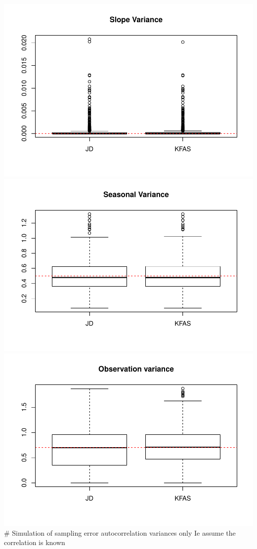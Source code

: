 \documentclass[]{article}
\begin{document}
\includegraphics{simulation_test_files/figure-latex/simulate-5.pdf}
\includegraphics{simulation_test_files/figure-latex/simulate-6.pdf}
\includegraphics{simulation_test_files/figure-latex/simulate-7.pdf} \#
Simulation of sampling error autocorrelation variances only Ie assume
the correlation is known
\end{document}
